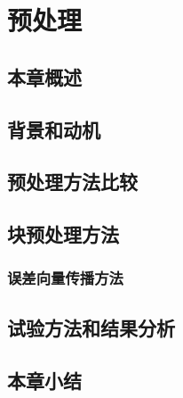 \chapter{预处理}
\label{cha:precond}

\section{本章概述}

\section{背景和动机}
\label{sec:precondBackgroud}

\section{预处理方法比较}
\label{sec:precond1}

\section{块预处理方法}
\label{sec:precond2}

\subsection{误差向量传播方法}
\label{sec:precondEVP}

\section{试验方法和结果分析}
\label{sec:precondExp}

\section{本章小结}
\label{sec:precondConclusion}
